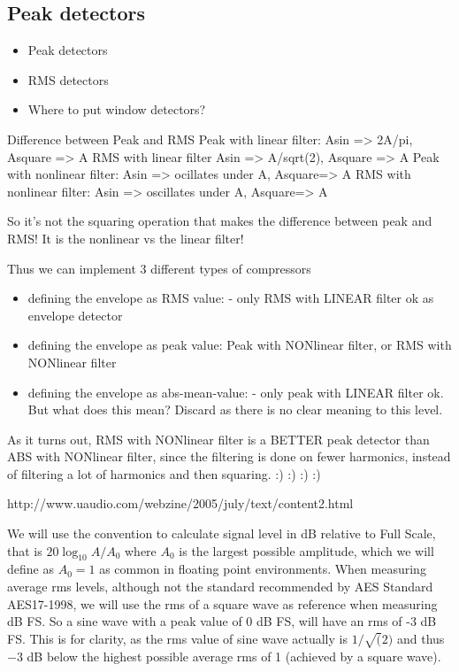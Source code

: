 \documentclass[../main2.tex]{subfiles}
\begin{document}
\subsection{Peak detectors}
\begin{itemize}
\item Peak detectors
\item RMS detectors
\item Where to put window detectors?
\end{itemize}
Difference between Peak and RMS
Peak with linear filter: Asin => 2A/pi, Asquare => A
RMS with linear filter Asin =>  A/sqrt(2), Asquare => A
Peak with nonlinear filter: Asin => ocillates under A, Asquare=> A
RMS with nonlinear filter: Asin => oscillates under A, Asquare=> A

So it's not the squaring operation that makes the difference between peak and RMS!
It is the nonlinear vs the linear filter!

Thus we can implement 3 different types of compressors
\begin{itemize}
\item defining the envelope as RMS value: - only RMS with LINEAR filter ok as envelope detector
\item defining the envelope as peak value: Peak with NONlinear filter, or RMS with NONlinear filter
\item defining the envelope as abs-mean-value: - only peak with LINEAR filter ok. But what does this mean? Discard as there is no clear meaning to this level.
\end{itemize}
As it turns out, RMS with NONlinear filter is a BETTER peak detector than ABS with NONlinear filter, since the filtering is done on fewer harmonics, instead of filtering a lot of harmonics and then squaring. :) :) :) :)

http://www.uaudio.com/webzine/2005/july/text/content2.html

We will use the convention to calculate signal level in dB relative to Full Scale, that is $20 \log_{10} A/A_0$ where $A_0$ is the largest possible amplitude, which we will define as $A_0 = 1$ as common in floating point environments.
When measuring average rms levels, although not the standard recommended by  AES Standard AES17-1998, we will use the rms of a square wave as reference when measuring dB FS. So a sine wave with a peak value of 0 dB FS, will have an rms of -3 dB FS. This is for clarity, as the rms value of sine wave actually is $1/\sqrt(2)$ and thus $-3$ dB below the highest possible average rms of 1 (achieved by a square wave). 
\end{document}

